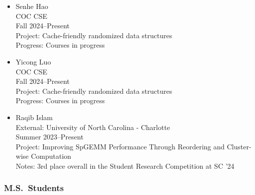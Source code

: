 \begin{adjustwidth}{2em}{0pt}
\begin{itemize}
    \item
        Senhe Hao \\
        COC CSE\\
        Fall 2024--Present \\
        Project: Cache-friendly randomized data structures\\
        Progress: Courses in progress
    \item
        Yicong Luo \\
        COC CSE\\
        Fall 2024--Present \\
        Project: Cache-friendly randomized data structures\\
        Progress: Courses in progress
    \item
        Raqib Islam \\
        External: University of North Carolina - Charlotte\\
        Summer 2023--Present \\
        Project: Improving SpGEMM Performance Through Reordering and Cluster-wise Computation\\
        Notes: 3rd place overall in the Student Research Competition at SC '24
\end{itemize}

\subsubsection{M.S.\ Students}


\end{adjustwidth}
